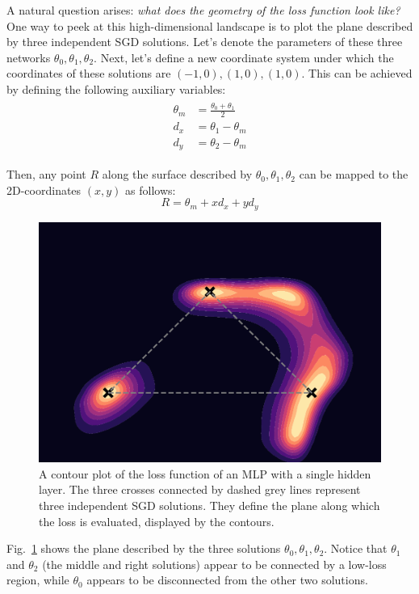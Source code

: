 \documentclass[12pt]{article}
\begin{document}
A natural question arises: \textit{what does the geometry of the loss function look like?} One way to peek at this high-dimensional landscape is to plot the plane described by three independent SGD solutions. Let's denote the parameters of these three networks $\theta_0, \theta_1, \theta_2$. Next, let's define a new coordinate system under which the coordinates of these solutions are $(-1, 0), (1, 0), (1, 0)$. This can be achieved by defining the following auxiliary variables:
\begin{align}
\begin{split}
\theta_m &= \frac{\theta_0 + \theta_1}{2} \\
d_x &= \theta_1 - \theta_m \\
d_y &= \theta_2 - \theta_m
\end{split}
\end{align}

Then, any point $R$ along the surface described by $\theta_0, \theta_1, \theta_2$ can be mapped to the 2D-coordinates $(x, y)$ as follows:
\begin{equation}
R = \theta_m + x d_x + y d_y
\end{equation}

\begin{figure}[H]
\centering
\includegraphics[width=12cm]{plots/loss_landscape.pdf}
\caption{A contour plot of the loss function of an MLP with a single hidden layer. The three crosses connected by dashed grey lines represent three independent SGD solutions. They define the plane along which the loss is evaluated, displayed by the contours.}
\label{fig_loss_landscape}
\end{figure}

Fig.\ \ref{fig_loss_landscape} shows the plane described by the three solutions $\theta_0, \theta_1, \theta_2$. Notice that $\theta_1$ and $\theta_2$ (the middle and right solutions) appear to be connected by a low-loss region, while $\theta_0$ appears to be disconnected from the other two solutions.
\end{document}
